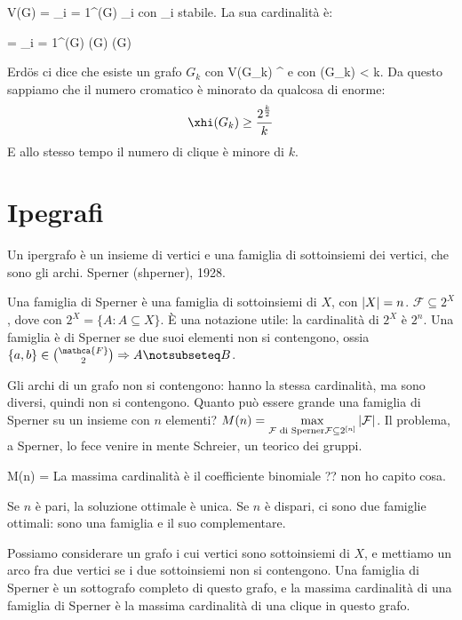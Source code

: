 	V(G) = \bigcup_{i = 1}^{\xhi(G)} \Alpha_i con \Alpha_i stabile.
	La sua cardinalit\`a \`e:

	 = \sum_{i = 1}^{\xhi(G)}  \le \xhi(G) \cdot \alpha(G)

	Erd\"os ci dice che esiste un grafo $G_k$ con V(G_k) ^{} e con \alpha(G_k) < k.
	Da questo sappiamo che il numero cromatico \`e minorato da qualcosa di enorme:
	\[
		\xhi(G_k) \ge \frac{2^{\frac{k}{2}}}{k}
	\]
	E allo stesso tempo il numero di clique \`e minore di $k$.

	\section{Ipegrafi}

	Un ipergrafo \`e un insieme di vertici e una famiglia di sottoinsiemi dei vertici, che sono gli archi.
	Sperner (shperner), 1928.

	Una famiglia di Sperner \`e una famiglia di sottoinsiemi di $X$, con $\left\lvert{X}\right\rvert = n$.
	$\mathcal{F} \subseteq 2^X$, dove con $2^X = \{ A : A \subseteq X \}$.
	\`E una notazione utile: la cardinalit\`a di $2^X$ \`e $2^n$.
	Una famiglia \`e di Sperner se due suoi elementi non si contengono, ossia $\{a,b\} \in \binom{\mathca{F}}{2} \implies A \notsubseteq B$.

	Gli archi di un grafo non si contengono: hanno la stessa cardinalit\`a, ma sono diversi, quindi non si contengono.
	Quanto pu\`o essere grande una famiglia di Sperner su un insieme con $n$ elementi?
	$M(n) = \max\limits_{\mathcal{F} \text{ di Sperner} \\ \mathcal{F} \subseteq 2^{[n]}} \left\lvert{\mathcal{F}}\right\rvert$.
	Il problema, a Sperner, lo fece venire in mente Schreier, un teorico dei gruppi.

	\begin{theorem}[di Sperner (1928)]
		M(n) = 
		La massima cardinalit\`a \`e il coefficiente binomiale ?? non ho capito cosa.

		Se $n$ \`e pari, la soluzione ottimale \`e unica.
		Se $n$ \`e dispari, ci sono due famiglie ottimali: sono una famiglia e il suo complementare.
	\end{theorem}

	Possiamo considerare un grafo i cui vertici sono sottoinsiemi di $X$, e mettiamo un arco fra due vertici se i due sottoinsiemi non si contengono.
	Una famiglia di Sperner \`e un sottografo completo di questo grafo, e la massima cardinalit\`a di una famiglia di Sperner \`e la massima cardinalit\`a di una clique in questo grafo.

